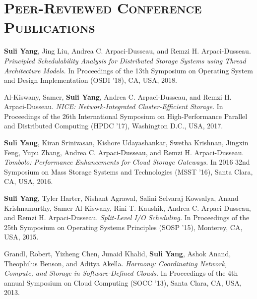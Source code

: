 \documentclass[10pt, letterpaper]{article}
\begin{document}
\section*{\textsc{Peer-Reviewed Conference Publications}}

\begin{enumerate}[fullwidth,itemindent=1.1em,label={[\arabic*]}]


	\item {\bf Suli Yang}, Jing Liu, Andrea C. Arpaci-Dusseau, and Remzi H. Arpaci-Dusseau. \textit{Principled Schedulability Analysis for Distributed Storage Systems using Thread Architecture Models.}
        In Proceedings of the 13th Symposium on Operating System and Design Implementation (OSDI '18), CA, USA, 2018.

        \item Al-Kiswany, Samer, {\bf Suli Yang}, Andrea C. Arpaci-Dusseau, and Remzi H. Arpaci-Dusseau. \textit{NICE: Network-Integrated Cluster-Efficient Storage.}  
        In Proceedings of the 26th International Symposium on High-Performance Parallel and Distributed Computing (HPDC '17), Washington D.C., USA, 2017.

        \item {\bf Suli Yang}, Kiran Srinivasan, Kishore Udayashankar, Swetha Krishnan, Jingxin Feng, Yupu Zhang, Andrea C. Arpaci-Dusseau, and Remzi H. Arpaci-Dusseau. \textit{Tombolo: Performance Enhancements for Cloud Storage Gateways.} 
         In 2016 32nd Symposium on Mass Storage Systems and Technologies (MSST '16), Santa Clara, CA, USA, 2016.

         \item {\bf Suli Yang}, Tyler Harter, Nishant Agrawal, Salini Selvaraj Kowsalya, Anand Krishnamurthy, Samer Al-Kiswany, Rini T. Kaushik, Andrea C. Arpaci-Dusseau, and Remzi H. Arpaci-Dusseau. \textit{Split-Level I/O Scheduling.} 
         In Proceedings of the 25th Symposium on Operating Systems Principles (SOSP '15), Monterey, CA, USA, 2015.

         \item Grandl, Robert, Yizheng Chen, Junaid Khalid, {\bf Suli Yang}, Ashok Anand, Theophilus Benson, and Aditya Akella. \textit{Harmony: Coordinating Network, Compute, and Storage in Software-Defined Clouds.}
          In Proceedings of the 4th annual Symposium on Cloud Computing (SOCC '13), Santa Clara, CA, USA, 2013.

\end{enumerate}
\end{document}
